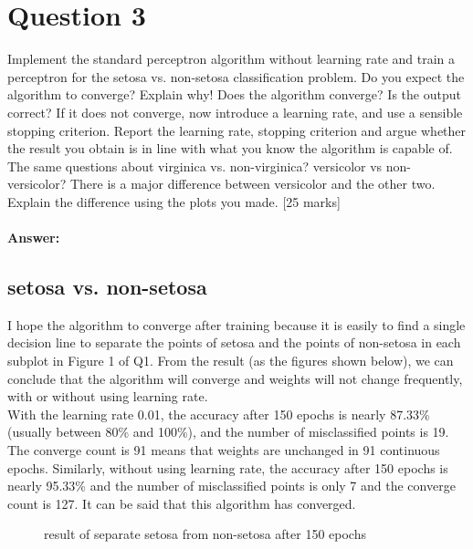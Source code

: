 \documentclass{article}
\begin{document}
\section{Question 3}
Implement the standard perceptron algorithm without learning rate and train a perceptron for the setosa vs. non-setosa classification problem. Do you expect the algorithm to converge? Explain why! Does the algorithm converge? Is the output correct? If it does not converge, now introduce a learning rate, and use a sensible stopping criterion. Report the learning rate, stopping criterion and argue whether the result you obtain is in line with what you know the algorithm is capable of. The same questions about virginica vs. non-virginica? versicolor vs non-versicolor? There is a major difference between versicolor and the other two. Explain the difference using the plots you made.
[25 marks]\\\\
\textbf{Answer:}
\subsection{setosa vs. non-setosa}
I hope the algorithm to converge after training because it is easily to find a single decision line to separate the points of setosa and the points of non-setosa in each subplot in Figure 1 of Q1. From the result (as the figures shown below), we can conclude that the algorithm will converge and weights will not change frequently, with or without using learning rate.\\
With the learning rate 0.01, the accuracy after 150 epochs is nearly 87.33\% (usually between 80\% and 100\%), and the number of misclassified points is 19. The converge count is 91 means that weights are unchanged in 91 continuous epochs. Similarly, without using learning rate, the accuracy after 150 epochs is nearly 95.33\% and the number of misclassified points is only 7 and the converge count is 127. It can be said that this algorithm has converged.
\begin{figure}[H]
\centering
{}
\caption{result of separate setosa from non-setosa after 150 epochs} \label{fig:1}
\end{figure}
\noindent
\end{document}
